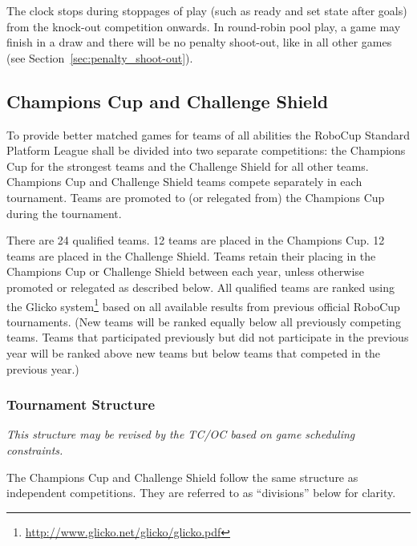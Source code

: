 The clock stops during stoppages of play (such as ready and set state after goals) from the knock-out competition onwards.  In round-robin pool play, a game may finish in a draw and there will be no penalty shoot-out, like in all other games (see Section~\ref{sec:penalty_shoot-out}).

\subsection{Champions Cup and Challenge Shield}
\label{sec:twoCompetitions}

To provide better matched games for teams of all abilities the RoboCup Standard Platform League shall be divided into two separate competitions: the Champions Cup for the strongest teams and the Challenge Shield for all other teams. Champions Cup and Challenge Shield teams compete separately in each tournament. Teams are promoted to (or relegated from) the Champions Cup during the tournament. 

There are 24 qualified teams. 12 teams are placed in the Champions Cup. 12 teams are placed in the Challenge Shield. Teams retain their placing in the Champions Cup or Challenge Shield between each year, unless otherwise promoted or relegated as described below. 
All qualified teams are ranked using the Glicko system\footnote{\url{http://www.glicko.net/glicko/glicko.pdf}} based on all available results from previous official RoboCup tournaments. (New teams will be ranked equally below all previously competing teams. Teams that participated previously but did not participate in the previous year will be ranked above new teams but below teams that competed in the previous year.)

\subsubsection{Tournament Structure}
\emph{This structure may be revised by the TC/OC based on game scheduling constraints.} 

The Champions Cup and Challenge Shield follow the same structure as independent competitions. They are referred to as ``divisions'' below for clarity.

